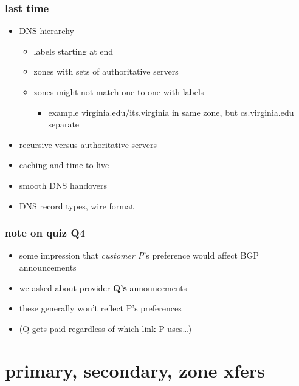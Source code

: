 \date{}
\title{}
\date{}

\begin{frame}
    \titlepage
\end{frame}



\begin{frame}
\frametitle{last time}
    \begin{itemize}
        \item DNS hierarchy
            \begin{itemize}
            \item labels starting at end
            \item zones with sets of authoritative servers
            \item zones might not match one to one with labels
                \begin{itemize}
                \item example virginia.edu/its.virginia in same zone, but cs.virginia.edu separate
                \end{itemize}
            \end{itemize}
        \item recursive versus authoritative servers
        \item caching and time-to-live
        \item smooth DNS handovers
        \item DNS record types, wire format
    \end{itemize}
\end{frame}

\begin{frame}
\frametitle{note on quiz Q4}
    \begin{itemize}
        \item some impression that \textit{customer P}'s preference would affect BGP announcements
        \item we asked about provider \textbf{Q's} announcements
        \item these generally won't reflect P's preferences
            \vspace{.5cm}
        \item (Q gets paid regardless of which link P uses\ldots)
    \end{itemize}
\end{frame}


\section{primary, secondary, zone xfers}

